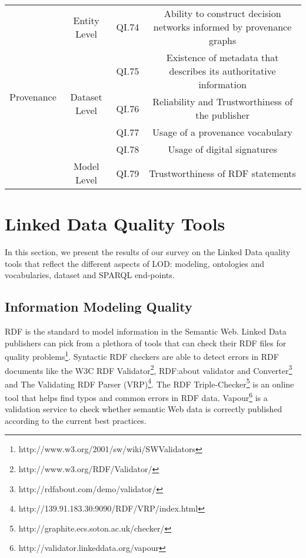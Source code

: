 \documentclass[onecolumn, crcready]{iosart2c}
\begin{document}
\begin{landscape}
\begin{center}
{\begin{longtable}[h]{|c|c|c|c|}
\hline
\hline
\multirow{6}{*}{Provenance} & \multirow{1}{*}{Entity Level} & QI.74 & Ability to construct decision networks informed by provenance graphs \cite{Gamble2011}\tabularnewline
\cline{2-4}
 & \multirow{4}{*}{Dataset Level} & QI.75 & Existence of metadata that describes its authoritative information  \cite{Flouris2012}\tabularnewline
\cline{3-4}
 &  & QI.76 & Reliability and Trustworthiness of the publisher \cite{Flouris2012}\tabularnewline
\cline{3-4}
 &  & QI.77 & Usage of a provenance vocabulary\tabularnewline
\cline{3-4}
 &  & QI.78 & Usage of digital signatures \cite{Framework2012}\tabularnewline
\cline{2-4}
 & \multirow{1}{*}{Model Level} & QI.79 & Trustworthiness of RDF statements \cite{Hartig09usingweb}\tabularnewline
\hline
\end{longtable}
}
\end{center}
\end{landscape}

\section{Linked Data Quality Tools}
In this section, we present the results of our survey on the Linked Data quality tools that reflect the different aspects of LOD: modeling, ontologies and vocabularies, dataset and SPARQL end-points.\\


\subsection{Information Modeling Quality}
RDF is the standard to model information in the Semantic Web. Linked Data publishers can pick from a plethora of tools that can check their RDF files for quality problems\footnote{http://www.w3.org/2001/sw/wiki/SWValidators}. Syntactic RDF checkers are able to detect errors in RDF documents like the W3C RDF Validator\footnote{http://www.w3.org/RDF/Validator/}, RDF:about validator and Converter\footnote{http://rdfabout.com/demo/validator/} and The Validating RDF Parser (VRP)\footnote{http://139.91.183.30:9090/RDF/VRP/index.html}. The RDF Triple-Checker\footnote{http://graphite.ecs.soton.ac.uk/checker/} is an online tool that helps find typos and common errors in RDF data. Vapour\footnote{http://validator.linkeddata.org/vapour} \cite{Berrueta08cookinghttp} is a validation service to check whether semantic Web data is correctly published according to the current best practices\cite{tim:linkedata}.
\end{document}
